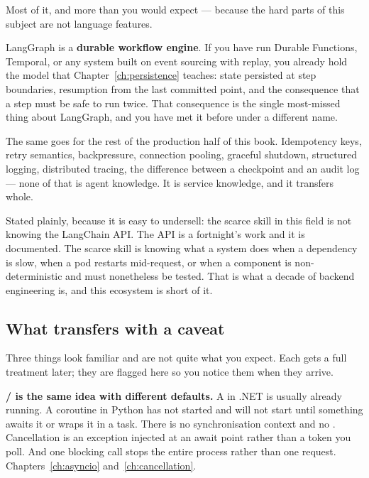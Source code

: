 Most of it, and more than you would expect --- because the hard parts of this
subject are not language features.

LangGraph is a \textbf{durable workflow engine}. If you have run Durable
Functions, Temporal, or any system built on event sourcing with replay, you
already hold the model that Chapter~\ref{ch:persistence} teaches: state persisted
at step boundaries, resumption from the last committed point, and the
consequence that a step must be safe to run twice. That consequence is the single
most-missed thing about LangGraph, and you have met it before under a different
name.

The same goes for the rest of the production half of this book. Idempotency
keys, retry semantics, backpressure, connection pooling, graceful shutdown,
structured logging, distributed tracing, the difference between a checkpoint and
an audit log --- none of that is agent knowledge. It is service knowledge, and it
transfers whole.

\begin{note}
Stated plainly, because it is easy to undersell: the scarce skill in this field
is not knowing the LangChain API. The API is a fortnight's work and it is
documented. The scarce skill is knowing what a system does when a dependency is
slow, when a pod restarts mid-request, or when a component is non-deterministic
and must nonetheless be tested. That is what a decade of backend engineering is,
and this ecosystem is short of it.
\end{note}

\subsection{What transfers with a caveat}

Three things look familiar and are not quite what you expect. Each gets a full
treatment later; they are flagged here so you notice them when they arrive.

\textbf{/ is the same idea with different defaults.}
A  in .NET is usually already running. A coroutine in Python has not
started and will not start until something awaits it or wraps it in a task. There
is no synchronisation context and no . Cancellation is an
exception injected at an await point rather than a token you poll. And one
blocking call stops the entire process rather than one request.
Chapters~\ref{ch:asyncio} and~\ref{ch:cancellation}.

